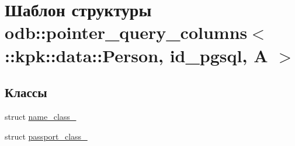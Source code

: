 \hypertarget{structodb_1_1pointer__query__columns_3_01_1_1kpk_1_1data_1_1_person_00_01id__pgsql_00_01_a_01_4}{}\section{Шаблон структуры odb\+:\+:pointer\+\_\+query\+\_\+columns$<$ \+:\+:kpk\+:\+:data\+:\+:Person, id\+\_\+pgsql, A $>$}
\label{structodb_1_1pointer__query__columns_3_01_1_1kpk_1_1data_1_1_person_00_01id__pgsql_00_01_a_01_4}
\subsection*{Классы}
\begin{DoxyCompactItemize}
\item 
struct \hyperlink{structodb_1_1pointer__query__columns_3_01_1_1kpk_1_1data_1_1_person_00_01id__pgsql_00_01_a_01_4_1_1name__class__}{name\+\_\+class\+\_\+}
\item 
struct \hyperlink{structodb_1_1pointer__query__columns_3_01_1_1kpk_1_1data_1_1_person_00_01id__pgsql_00_01_a_01_4_1_1passport__class__}{passport\+\_\+class\+\_\+}
\end{DoxyCompactItemize}
